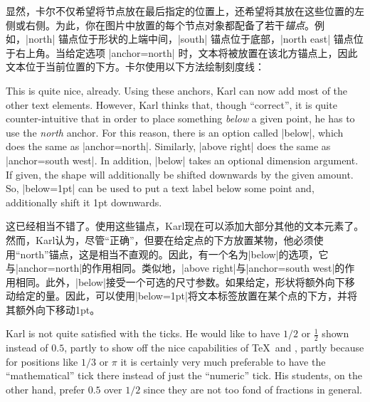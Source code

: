 显然，卡尔不仅希望将节点放在最后指定的位置上，还希望将其放在这些位置的左侧或右侧。为此，你在图片中放置的每个节点对象都配备了若干\emph{锚点}。例如，|north| 锚点位于形状的上端中间，|south| 锚点位于底部，|north east| 锚点位于右上角。当给定选项 |anchor=north| 时，文本将被放置在该北方锚点上，因此文本位于当前位置的下方。卡尔使用以下方法绘制刻度线：

\begin{codeexample}[]
\end{codeexample}

This is quite nice, already. Using these anchors, Karl can now add most of the
other text elements. However, Karl thinks that, though ``correct'', it is quite
counter-intuitive that in order to place something \emph{below} a given point,
he has to use the \emph{north} anchor. For this reason, there is an option
called |below|, which does the same as |anchor=north|. Similarly, |above right|
does the same as |anchor=south west|. In addition, |below| takes an optional
dimension argument. If given, the shape will additionally be shifted downwards
by the given amount. So, |below=1pt| can be used to put a text label below some
point and, additionally shift it  1pt downwards.

这已经相当不错了。使用这些锚点，Karl现在可以添加大部分其他的文本元素了。然而，Karl认为，尽管“正确”，但要在给定点的下方放置某物，他必须使用“north”锚点，这是相当不直观的。因此，有一个名为|below|的选项，它与|anchor=north|的作用相同。类似地，|above right|与|anchor=south west|的作用相同。此外，|below|接受一个可选的尺寸参数。如果给定，形状将额外向下移动给定的量。因此，可以使用|below=1pt|将文本标签放置在某个点的下方，并将其额外向下移动1pt。



Karl is not quite satisfied with the ticks. He would like to have $1/2$ or
$\frac{1}{2}$ shown instead of $0.5$, partly to show off the nice capabilities
of \TeX\ and \tikzname, partly because for positions like $1/3$ or $\pi$ it is
certainly very much preferable to have the ``mathematical'' tick there instead
of just the ``numeric'' tick. His students, on the other hand, prefer $0.5$
over $1/2$ since they are not too fond of fractions in general.



